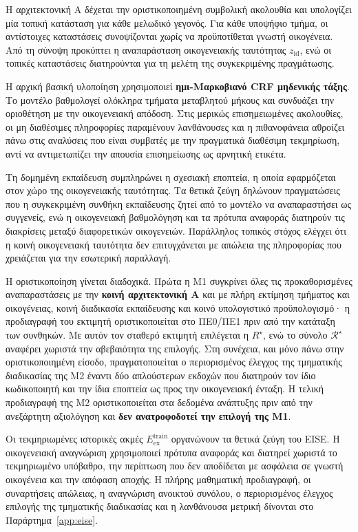 \documentclass[11pt,a4paper]{article}
\begin{document}
Η αρχιτεκτονική A δέχεται την οριστικοποιημένη συμβολική ακολουθία και υπολογίζει μία τοπική κατάσταση για κάθε μελωδικό γεγονός. Για κάθε υποψήφιο τμήμα, οι αντίστοιχες καταστάσεις συνοψίζονται χωρίς να προϋποτίθεται γνωστή οικογένεια. Από τη σύνοψη προκύπτει η αναπαράσταση οικογενειακής ταυτότητας $z_{\mathrm{id}}$, ενώ οι τοπικές καταστάσεις διατηρούνται για τη μελέτη της συγκεκριμένης πραγμάτωσης.

Η αρχική βασική υλοποίηση χρησιμοποιεί \textbf{ημι-Μαρκοβιανό CRF μηδενικής τάξης}. Το μοντέλο βαθμολογεί ολόκληρα τμήματα μεταβλητού μήκους και συνδυάζει την οριοθέτηση με την οικογενειακή απόδοση. Στις μερικώς επισημειωμένες ακολουθίες, οι μη διαθέσιμες πληροφορίες παραμένουν λανθάνουσες και η πιθανοφάνεια αθροίζει πάνω στις αναλύσεις που είναι συμβατές με την πραγματικά διαθέσιμη τεκμηρίωση, αντί να αντιμετωπίζει την απουσία επισημείωσης ως αρνητική ετικέτα.

Τη δομημένη εκπαίδευση συμπληρώνει η σχεσιακή εποπτεία, η οποία εφαρμόζεται στον χώρο της οικογενειακής ταυτότητας. Τα θετικά ζεύγη δηλώνουν πραγματώσεις που η συγκεκριμένη συνθήκη εκπαίδευσης ζητεί από το μοντέλο να αναπαραστήσει ως συγγενείς, ενώ η οικογενειακή βαθμολόγηση και τα πρότυπα αναφοράς διατηρούν τις διακρίσεις μεταξύ διαφορετικών οικογενειών. Παράλληλος τοπικός στόχος ελέγχει ότι η κοινή οικογενειακή ταυτότητα δεν επιτυγχάνεται με απώλεια της πληροφορίας που χρειάζεται για την εσωτερική παραλλαγή.

Η οριστικοποίηση γίνεται διαδοχικά. Πρώτα η M1 συγκρίνει όλες τις προκαθορισμένες αναπαραστάσεις με την \textbf{κοινή αρχιτεκτονική A} και με πλήρη εκτίμηση τμήματος και οικογένειας, κοινή διαδικασία εκπαίδευσης και κοινό υπολογιστικό προϋπολογισμό· η προδιαγραφή του εκτιμητή οριστικοποιείται στο ΠΕ0/ΠΕ1 πριν από την κατάταξη των συνθηκών. Με αυτόν τον σταθερό εκτιμητή επιλέγεται η $R^\star$, ενώ το σύνολο $\mathcal R^\star$ αναφέρει χωριστά την αβεβαιότητα της επιλογής. Στη συνέχεια, και μόνο πάνω στην οριστικοποιημένη είσοδο, πραγματοποιείται ο περιορισμένος έλεγχος της τμηματικής διαδικασίας της M2 έναντι δύο απλούστερων εκδοχών που διατηρούν τον ίδιο κωδικοποιητή και την ίδια εποπτεία ως προς την οικογενειακή ένταξη. Η τελική προδιαγραφή της M2 οριστικοποιείται στα δεδομένα ανάπτυξης πριν από την ανεξάρτητη αξιολόγηση και \textbf{δεν ανατροφοδοτεί την επιλογή της M1}.

Οι τεκμηριωμένες ιστορικές ακμές $E_{\mathrm{ex}}^{\mathrm{train}}$ οργανώνουν τα θετικά ζεύγη του EISE. Η οικογενειακή αναγνώριση χρησιμοποιεί πρότυπα αναφοράς και διατηρεί χωριστά το τεκμηριωμένο υπόβαθρο, την περίπτωση που δεν αποδίδεται με ασφάλεια σε γνωστή οικογένεια και την απόφαση αποχής. Η πλήρης μαθηματική προδιαγραφή, οι συναρτήσεις απώλειας, η αναγνώριση ανοικτού συνόλου, ο περιορισμένος έλεγχος επιλογής της τμηματικής διαδικασίας και η λανθάνουσα μετρική δίνονται στο Παράρτημα~\ref{app:eise}.
\end{document}
